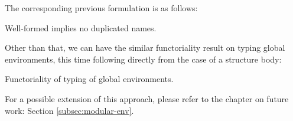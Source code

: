 The corresponding previous formulation is as follows:

\begin{listing}[H]
  \caption{Well-formed implies no duplicated names.}
  \label{lst:2-typing-nodup}
\end{listing}

Other than that, we can have the similar functoriality result on typing global
environments, this time following directly from the case of a structure body:

\begin{listing}[H]
  \caption{Functoriality of typing of global environments.}
  \label{lst:2-typing-funct}
\end{listing}

For a possible extension of this approach, please refer to the chapter on future
work: Section \ref{subsec:modular-env}.